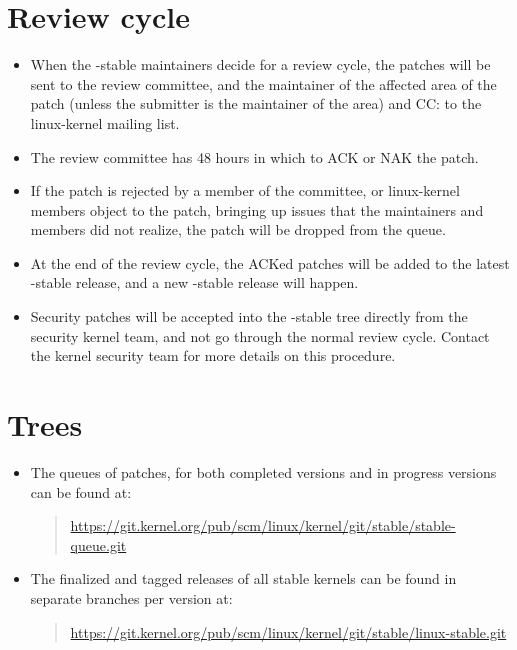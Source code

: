 \documentclass[a4paper,8pt,english]{sphinxmanual}
\begin{document}
\section{Review cycle}
\label{process/stable-kernel-rules:review-cycle}\begin{itemize}
\item {} 
When the -stable maintainers decide for a review cycle, the patches will be
sent to the review committee, and the maintainer of the affected area of
the patch (unless the submitter is the maintainer of the area) and CC: to
the linux-kernel mailing list.

\item {} 
The review committee has 48 hours in which to ACK or NAK the patch.

\item {} 
If the patch is rejected by a member of the committee, or linux-kernel
members object to the patch, bringing up issues that the maintainers and
members did not realize, the patch will be dropped from the queue.

\item {} 
At the end of the review cycle, the ACKed patches will be added to the
latest -stable release, and a new -stable release will happen.

\item {} 
Security patches will be accepted into the -stable tree directly from the
security kernel team, and not go through the normal review cycle.
Contact the kernel security team for more details on this procedure.

\end{itemize}


\section{Trees}
\label{process/stable-kernel-rules:trees}\begin{itemize}
\item {} 
The queues of patches, for both completed versions and in progress
versions can be found at:
\begin{quote}

\href{https://git.kernel.org/pub/scm/linux/kernel/git/stable/stable-queue.git}{https://git.kernel.org/pub/scm/linux/kernel/git/stable/stable-queue.git}
\end{quote}

\item {} 
The finalized and tagged releases of all stable kernels can be found
in separate branches per version at:
\begin{quote}

\href{https://git.kernel.org/pub/scm/linux/kernel/git/stable/linux-stable.git}{https://git.kernel.org/pub/scm/linux/kernel/git/stable/linux-stable.git}
\end{quote}

\end{itemize}
\end{document}
